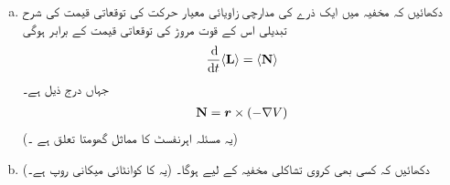 \begin{enumerate}[a.]
\item
دکھائیں کہ  مخفیہ    میں ایک ذرے کی مدارچی زاویائی معیار حرکت  کی توقعاتی قیمت کی شرح  تبدیلی اس کے قوت مروڑ کی توقعاتی قیمت کے برابر ہوگی 
\begin{align*}
\frac{\dif}{\dif t} \langle \mat{L} \rangle = \langle \mat{N} \rangle
\end{align*}
جہاں  درج ذیل ہے۔
\begin{align*}
\operatorname{\mathbf{N}} = {{\boldsymbol{r}}} \times (- \nabla V)
\end{align*}
(یہ مسئلہ اہرنفسٹ کا مماثل گھومتا تعلق ہے ۔)
\item
دکھائیں کہ  کسی بھی کروی تشاکلی مخفیہ کے لیے  ہوگا۔ (یہ  کا کوانٹائی میکانی روپ ہے۔) 
\end{enumerate}


